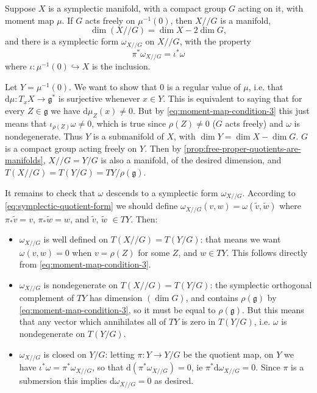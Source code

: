 \documentclass[12pt,letterpaper,reqno]{article}
\numberwithin{equation}{section}
\newcommand{\fg}{{\mathfrak g}}
\newcommand{\kq}{/\!\!/}
\newcommand{\de}{\mathrm{d}}
\begin{document}
\begin{prop} \label{prop:symplectic-quotient-is-symplectic}
Suppose $X$ is a symplectic manifold, with a compact group $G$
acting on it, with moment map $\mu$.
If $G$ acts freely
on $\mu^{-1}(0)$, then $X \kq G$ is a manifold,
\begin{equation}
  \dim (X \kq G) = \dim X - 2 \dim G,
\end{equation}
and there is a symplectic form $\omega_{X \kq G}$
on $X \kq G$,
with the property
\begin{equation} \label{eq:symplectic-quotient-form}
  \pi^* \omega_{X \kq G} = \iota^* \omega
\end{equation}
where $\iota: \mu^{-1}(0) \hookrightarrow X$ is the inclusion.
\end{prop}
\begin{pf}
Let $Y = \mu^{-1}(0)$.
We want to show that $0$ is a regular value of $\mu$,
i.e. that $\de \mu: T_x X \to \fg^*$ is surjective
whenever $x \in Y$. This 
is equivalent to saying that for every $Z \in \fg$
we have $\de \mu_Z(x) \neq 0$.
But by \eqref{eq:moment-map-condition-3} this just means
that $\iota_{\rho(Z)} \omega \neq 0$,
which is true since $\rho(Z) \neq 0$ ($G$ acts freely)
and $\omega$ is nondegenerate.
Thus $Y$ is a submanifold of $X$,
with $\dim Y = \dim X - \dim G$.
$G$ is a compact group acting freely on $Y$.
Then by \autoref{prop:free-proper-quotients-are-manifolds}, 
$X \kq G = Y / G$ is also a manifold, of the desired 
dimension, and $T(X \kq G) = T(Y/G) = TY / \rho(\fg)$.

It remains to check that $\omega$ descends to a
symplectic form $\omega_{X \kq G}$. According
to \eqref{eq:symplectic-quotient-form} we should define
$\omega_{X \kq G}(v,w) = \omega(\tilde v, \tilde w)$
where $\pi_* \tilde v = v$, $\pi_* \tilde w = w$,
and $\tilde v$, $\tilde w$ $\in TY$.
Then:
\begin{itemize} 
\item $\omega_{X \kq G}$ is well defined
on $T(X \kq G) = T(Y/G)$: that means we want $\omega(v,w) = 0$
when $v = \rho(Z)$
for some $Z$, and $w \in TY$. This follows directly from
\eqref{eq:moment-map-condition-3}.
\item $\omega_{X \kq G}$ is nondegenerate on $T(X \kq G) = T(Y/G)$:
the symplectic orthogonal complement of $TY$ has dimension
$(\dim G)$, and contains $\rho(\fg)$ by
\eqref{eq:moment-map-condition-3}, so it must be equal
to $\rho(\fg)$. But this means that any vector which
annihilates all of $TY$ is zero in $T(Y/G)$, i.e.
$\omega$ is nondegenerate on $T(Y/G)$.
\item $\omega_{X \kq G}$ is closed on $Y/G$: 
letting $\pi: Y \to Y/G$ be the quotient map,
on $Y$ we have $\iota^* \omega = \pi^* \omega_{X \kq G}$,
so that $\de (\pi^* \omega_{X \kq G}) = 0$,
ie $\pi^* \de \omega_{X \kq G} = 0$.
Since $\pi$ is a submersion this implies
$\de \omega_{X \kq G} = 0$ as desired.
\end{itemize}
\end{pf}
\end{document}
